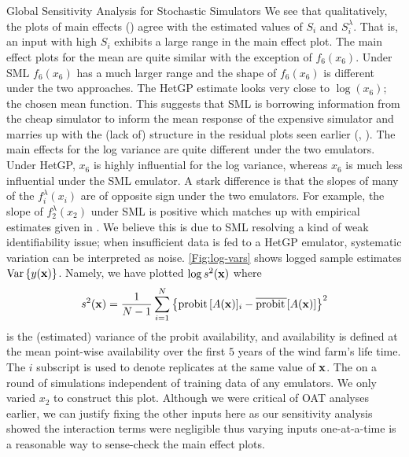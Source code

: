 \begin{chapter}{Global Sensitivity Analysis for Stochastic Simulators\label{Ch:sensitivity}}
We see that qualitatively, the plots of main effects () agree with the estimated values of $S_i$ and $S^{\lambda}_i$. That is, an input with high $S_i$ exhibits a large range in the main effect plot. The main effect plots for the mean are quite similar with the exception of $f_6(x_6)$. Under SML $f_6(x_6)$ has a much larger range and the shape of $f_6(x_6)$ is different under the two approaches. The HetGP estimate looks very close to $\log(x_6)$; the chosen mean function. This suggests that SML is borrowing information from the cheap simulator to inform the mean response of the expensive simulator and marries up with the (lack of) structure in the residual plots seen earlier (, ). The main effects for the log variance are quite different under the two emulators. Under HetGP, $x_6$ is highly influential for the log variance, whereas $x_6$ is much less influential under the SML emulator. A stark difference is that the slopes of many of the $f_{i}^{ \lambda }(x_i)$ are of opposite sign under the two emulators. For example, the slope of $f_2^{ \lambda }(x_2)$ under SML is positive which matches up with empirical estimates given in .  We believe this is due to SML resolving a kind of weak identifiability issue; when insufficient data is fed to a HetGP emulator, systematic variation can be interpreted as noise. \cref{Fig:log-vars} shows logged sample estimates $\mathrm{Var}\, \{ y(\mathbf{x}) \} $. Namely, we have plotted $\log s^2(\mathbf{x})$ where
\begin{equation}
  s^2(\mathbf{x}) =  \frac{1}{N-1} \sum_{i = 1}^N \left\{\text{probit}\,[A(\mathbf{x})]_i - \overline{\text{probit}\,}[A(\mathbf{x})]\right\}^2
\end{equation}
is the (estimated) variance of the probit availability, and availability is defined at the mean point-wise availability over the first $5$ years of the wind farm's life time. The $i$ subscript is used to denote replicates at the same value of $\mathbf{x}$. The  on a round of simulations independent of training data of any emulators. We only varied $x_2$ to construct this plot. Although we were critical of OAT analyses earlier, we can justify fixing the other inputs here as our sensitivity analysis showed the interaction terms were negligible thus varying inputs one-at-a-time is a reasonable way to sense-check the main effect plots.


\end{chapter}

